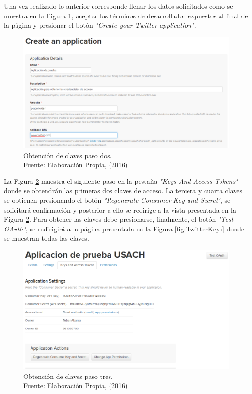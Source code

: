 Una vez realizado lo anterior corresponde llenar los datos solicitados como se muestra en la Figura \ref{fig:CreateAnApp}, aceptar los términos de desarrollador expuestos al final de la página y presionar el botón \textit{"Create your Twitter application"}. 

\begin{figure}[H]
        \centering
        \captionsetup{justification=centering}
        \includegraphics[scale=0.5]{images/CreateAnApplication.png}
        \caption[Obtención de claves paso dos.]{Obtención de claves paso dos.\\Fuente: Elaboración Propia, (2016)}
        \label{fig:CreateAnApp}
\end{figure}

La Figura \ref{fig:GetKey1} muestra el siguiente paso en la pestaña \textit{"Keys And Access Tokens"} donde se obtendrán las primeras dos claves de acceso. La tercera y cuarta claves se obtienen presionando el botón \textit{"Regenerate Consumer Key and Secret"}, se solicitará confirmación y posterior a ello se redirige a la vista presentada en la Figura \ref{fig:GetKey1}. Para obtener las claves debe presionarse, finalmente, el botón \textit{"Test OAuth"}, se redirigirá a la página presentada en la Figura \ref{fig:TwitterKeys} donde se muestran todas las claves.

\begin{figure}[H]
        \centering
        \captionsetup{justification=centering}
        \includegraphics[scale=0.6]{images/GetToken1.png}
        \caption[Obtención de claves paso tres.]{Obtención de claves paso tres.\\Fuente: Elaboración Propia, (2016)}
        \label{fig:GetKey1}
\end{figure}

